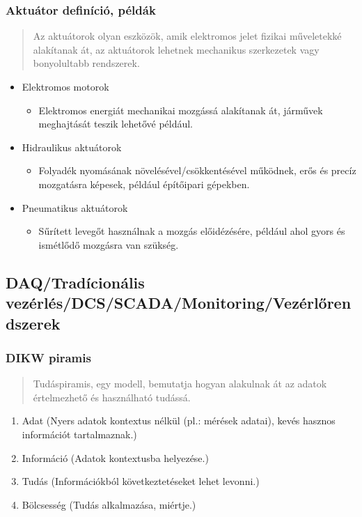 \subsubsection{Aktuátor definíció, példák}
\begin{quote}
    Az aktuátorok olyan eszközök, amik elektromos jelet fizikai műveletekké alakítanak át, az aktuátorok lehetnek mechanikus szerkezetek vagy bonyolultabb rendszerek.
\end{quote}
\begin{itemize}
    \item Elektromos motorok
    \begin{itemize}
        \item Elektromos energiát mechanikai mozgássá alakítanak át, járművek meghajtását teszik lehetővé például.
    \end{itemize}
    \item Hidraulikus aktuátorok
    \begin{itemize}
        \item Folyadék nyomásának növelésével/csökkentésével működnek, erős és precíz mozgatásra képesek, például építőipari gépekben.
    \end{itemize}
    \item Pneumatikus aktuátorok
    \begin{itemize}
        \item Sűrített levegőt használnak a mozgás előidézésére, például ahol gyors és ismétlődő mozgásra van szükség.
    \end{itemize}
\end{itemize}

\subsection{DAQ/Tradícionális vezérlés/DCS/SCADA/Monitoring/Vezérlőrendszerek}
\subsubsection{DIKW piramis}
\begin{quote}
    Tudáspiramis, egy modell, bemutatja hogyan alakulnak át az adatok értelmezhető és használható tudássá.
\end{quote}
\begin{enumerate}
    \item Adat (Nyers adatok kontextus nélkül (pl.: mérések adatai), kevés hasznos információt tartalmaznak.)
    \item Információ (Adatok kontextusba helyezése.)
    \item Tudás (Információkból következtetéseket lehet levonni.)
    \item Bölcsesség (Tudás alkalmazása, miértje.)
\end{enumerate}

